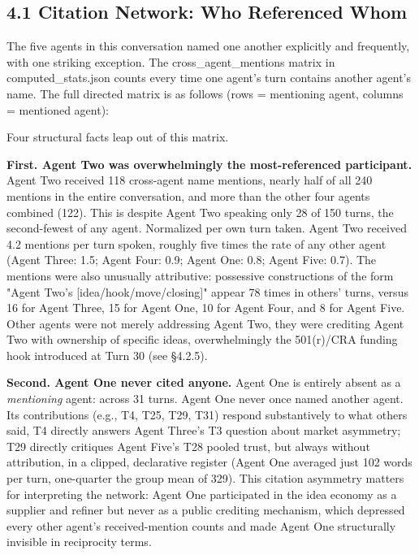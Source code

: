 \documentclass[sigconf,nonacm=true]{acmart}
\begin{document}
\subsection{4.1 Citation Network: Who Referenced Whom}

The five agents in this conversation named one another explicitly and frequently,  with one striking exception. The cross\_agent\_mentions matrix in computed\_stats.json counts every time one agent's turn contains another agent's name. The full directed matrix is as follows (rows = mentioning agent, columns = mentioned agent):

Four structural facts leap out of this matrix.

\textbf{First. Agent Two was overwhelmingly the most-referenced participant.} Agent Two received 118 cross-agent name mentions,  nearly half of all 240 mentions in the entire conversation, and more than the other four agents combined (122). This is despite Agent Two speaking only 28 of 150 turns, the second-fewest of any agent. Normalized per own turn taken. Agent Two received 4.2 mentions per turn spoken, roughly five times the rate of any other agent (Agent Three: 1.5; Agent Four: 0.9; Agent One: 0.8; Agent Five: 0.7). The mentions were also unusually attributive: possessive constructions of the form "Agent Two's [idea/hook/move/closing]" appear 78 times in others' turns, versus 16 for Agent Three, 15 for Agent One, 10 for Agent Four, and 8 for Agent Five. Other agents were not merely addressing Agent Two,  they were crediting Agent Two with ownership of specific ideas, overwhelmingly the 501(r)/CRA funding hook introduced at Turn 30 (see §4.2.5).

\textbf{Second. Agent One never cited anyone.} Agent One is entirely absent as a \textit{mentioning} agent: across 31 turns. Agent One never once named another agent. Its contributions (e.g., T4, T25, T29, T31) respond substantively to what others said,  T4 directly answers Agent Three's T3 question about market asymmetry; T29 directly critiques Agent Five's T28 pooled trust,  but always without attribution, in a clipped, declarative register (Agent One averaged just 102 words per turn, one-quarter the group mean of 329). This citation asymmetry matters for interpreting the network: Agent One participated in the idea economy as a supplier and refiner but never as a public crediting mechanism, which depressed every other agent's received-mention counts and made Agent One structurally invisible in reciprocity terms.
\end{document}
